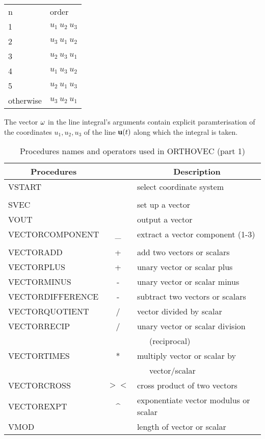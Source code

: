 \begin{center} 
\begin{tabular}{ll}
n & order\\ 1 & $u_1~u_2~u_3$\\
%
2 & $u_3~u_1~u_2$\\
%
3 & $u_2~u_3~u_1$\\
%
4 & $u_1~u_3~u_2$\\
%
5 & $u_2~u_1~u_3$\\ otherwise & $u_3~u_2~u_1$\\
\end{tabular}
\end{center}


The vector ${\bf \omega}$ in the line integral's arguments contain
explicit paramterisation of the coordinates $u_1, u_2, u_3$ of the
line ${\bf u}(t)$ along which the integral is taken.

\begin{table}
\begin{center}
\begin{tabular}{|l c l|} \hline 
\multicolumn{1}{|c}{Procedures} & & \multicolumn{1}{c|}{Description} \\ \hline
VSTART & & select coordinate
system \\ & & \\ SVEC & & set up a vector \\ VOUT & & output a vector
\\ VECTORCOMPONENT & \_ & extract a vector component (1-3) \\ & & \\
VECTORADD & + & add two vectors or scalars \\ 
VECTORPLUS & + & unary vector or scalar plus\\ 
VECTORMINUS & - & unary vector or scalar minus\\ 
VECTORDIFFERENCE & - & subtract two vectors or scalars \\ 
VECTORQUOTIENT & / & vector divided by scalar \\ 
VECTORRECIP & / & unary vector or scalar division \\ & & \ \ \ (reciprocal)\\ 
VECTORTIMES & * & multiply vector or scalar by \\ & & \ \ \ vector/scalar \\ 
VECTORCROSS & $><$ & cross product of two vectors \\ 
VECTOREXPT & \^{} & exponentiate vector modulus or scalar \\
VMOD & & length of vector or scalar \\ \hline
\end{tabular}
\end{center}
\caption{Procedures names and operators used in ORTHOVEC (part 1)}
\end{table}

